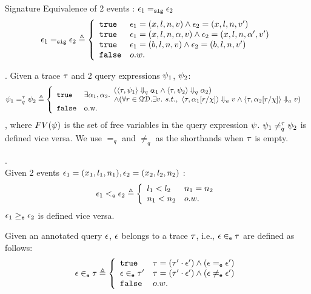 %
Signature Equivalence of 2 events : $\mathtt{\epsilon}_1 =_{\mathtt{sig}} \mathtt{\epsilon}_2$
\[
\event_1 \sigeq \event_2 \triangleq
\left\{
\begin{array}{ll}
\etrue & \event_1 = (x, l, n, v) \land \event_2 = (x, l, n, v') \\
\etrue & \event_1 = (x, l, n, \qval, v) \land \event_2 = (x, l, n, \qval', v') \\
\etrue & \event_1 = (b, l, n, v) \land \event_2 = (b, l, n, v') \\
\efalse & o.w.
\end{array}
\right.
\]
%
%
\begin{defn}.
%
\label{def:query_equal}
Given a trace $\mathtt{\tau}$ and 2 query expressions $\psi_1$, $\psi_2$:
$$
\qexpr_1 =_{q}^{\trace} \qexpr_2 \triangleq
\left\{
    \begin{array}{ll} 
      \etrue      
      & 
    \exists \qval_1, \qval_2.
    \begin{array}{l} 
      (\config{\trace,  \qexpr_1} \qarrow \qval_1 \land \config{\trace,  \qexpr_2 } \qarrow \qval_2) 
      \\
      \land (\forall r \in \qdom. \exists v. ~ s.t., ~ 
            \config{\trace, \qval_1[r/\chi]} \aarrow v \land \config{\trace,  \qval_2[r/\chi] } \aarrow v)  
    \end{array}\\
      \efalse         
      & \text{o.w.} 
    \end{array}
    \right.
$$
%
, where $FV(\psi)$ is the set of free variables in the query expression $\psi$.
$\psi_1 \neq_{q}^{\mathtt{\tau}} \psi_2$  is defined vice versa.
%
We use $=_{q}$  and $\neq_{q}$ as the shorthands when $\mathtt{\tau}$ is empty.
\end{defn}
%
\begin{defn}.
\label{def:query_dir}
\\
Given 2 events 
$\mathtt{\epsilon}_1 = (x_1, l_1, n_1), 
\mathtt{\epsilon}_2 = (x_2, l_2, n_2)$
:
%
\[
\event_1 \eventlt \event_2
 \triangleq 
 \left\{
 \begin{array}{ll}
    l_1 < l_2 & n_1 = n_2
    \\
    n_1 < n_2  & o.w.
\end{array}  
\right.
\]
%
$\mathtt{\epsilon}_1 \geq_{\mathtt{e}} \mathtt{\epsilon}_2$  is defined vice versa.
\end{defn}
%
%
%
%
%
%
Given an annotated query $\mathtt{\epsilon}$, $\mathtt{\epsilon}$ belongs to a trace $\mathtt{\tau}$, i.e., $\mathtt{\epsilon} \in_{\mathtt{e}} \mathtt{\tau}$ are defined as follows:
\begin{equation}
    \event \eventin \trace  
    \triangleq \left\{
    \begin{array}{ll} 
      \etrue                  & \trace =  (\trace' \cdot \event') \land (\event \eventeq \event') \\
      \event \eventin \trace' & \trace =  (\trace' \cdot \event') \land (\event \eventneq \event') \\ 
      \efalse                 & o.w.
    \end{array}
    \right.
  \end{equation}
